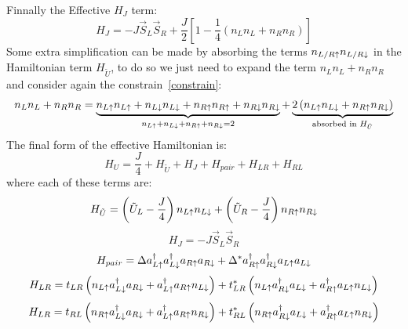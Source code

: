 Finnally the Effective $H_J$ term:
\begin{equation}
  H_J = -J\vec{S}_L\vec{S}_R +
      \frac{J}{2}\left[1 - \frac{1}{4}\left(n_Ln_L + n_Rn_R\right)\right]
\end{equation}
Some extra simplification can be made by absorbing the terms $n_{L/R\uparrow}n_{L/R\downarrow}$ in the Hamiltonian term $H_{\tilde{U}}$, to do so we just need to expand the term $n_Ln_L + n_Rn_R$ and consider again the constrain~\eqref{constrain}:
\begin{equation}
  n_Ln_L + n_Rn_R =
  \underbrace{n_{L\uparrow}n_{L\uparrow} + n_{L\downarrow}n_{L\downarrow} + n_{R\uparrow}n_{R\uparrow} +
   n_{R\downarrow}n_{R\downarrow}}_{n_{L\uparrow}+n_{L\downarrow}+n_{R\uparrow}+n_{R\downarrow} = 2} +
  \underbrace{2\left(n_{L\uparrow}n_{L\downarrow}+
   n_{R\uparrow}n_{R\downarrow}\right)}_{\text{absorbed in }H_{\tilde{U}}}
\end{equation}
The final form of the effective Hamiltonian is:
\begin{equation}
  H_U = \frac{J}{4} + H_{\tilde{U}} + H_J + H_{pair} + H_{LR} + H_{RL}
\label{effective_ham}
\end{equation}
where each of these terms are:
\begin{equation}
  H_{\tilde{U}} =
  \left(\tilde{U}_L-\frac{J}{4}\right) n_{L\uparrow}n_{L\downarrow} +
  \left(\tilde{U}_R-\frac{J}{4}\right) n_{R\uparrow}n_{R\downarrow}
\end{equation}
\begin{equation}
  H_J = -J\vec{S}_L\vec{S}_R
\end{equation}
\begin{equation}
  H_{pair} = \Delta a^{\dagger}_{L\uparrow}a^{\dagger}_{L\downarrow}a_{R\uparrow}a_{R\downarrow}+
             \Delta^* a^{\dagger}_{R\uparrow}a^{\dagger}_{R\downarrow}a_{L\uparrow}a_{L\downarrow}
\end{equation}
\begin{equation}
  H_{LR} = t_{LR} \left(n_{L\uparrow}a^{\dagger}_{L\downarrow}a_{R\downarrow}+
                   a^{\dagger}_{L\uparrow}a_{R\uparrow}n_{L\downarrow}\right)+
           t^*_{LR} \left(n_{L\uparrow}a^{\dagger}_{R\downarrow}a_{L\downarrow}+
                   a^{\dagger}_{R\uparrow}a_{L\uparrow}n_{L\downarrow}\right)
\end{equation}
\begin{equation}
  H_{LR} = t_{RL} \left(n_{R\uparrow}a^{\dagger}_{L\downarrow}a_{R\downarrow}+
                   a^{\dagger}_{L\uparrow}a_{R\uparrow}n_{R\downarrow}\right)+
           t^*_{RL} \left(n_{R\uparrow}a^{\dagger}_{R\downarrow}a_{L\downarrow}+
                   a^{\dagger}_{R\uparrow}a_{L\uparrow}n_{R\downarrow}\right)
\end{equation}



